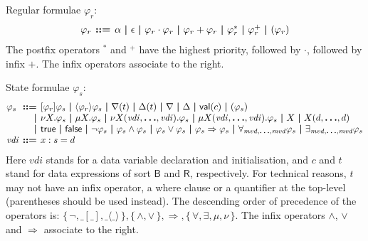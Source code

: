 \documentclass[a4paper,fleqn,10pt]{article}
\makeatletter
\newcommand{\f}[1]{\ensuremath{\mathit{#1}}}
\newcommand{\sbool}{\ensuremath{\mathsf{B}}}
\newcommand{\sreal}{\ensuremath{\mathsf{R}}}
\newenvironment{tightarray}[1]
  {\setlength{\arraycolsep}{2pt}%
   \begin{array}{@{}#1@{}}%
  }
  {\end{array}%
  }
\newcommand{\set}[1]{\ensuremath{\{\,#1\,\}}}
\newcommand{\limp}{\ensuremath{\Rightarrow}}
\newcommand{\mb}[1]{\text{\boldmath$#1$}}
\makeatother
\begin{document}
Regular formulae $\varphi_r$:
\[\begin{tightarray}{lrl}
\varphi_r & \mb{::=} & \alpha\ \mb{|}\ 
                       \epsilon\ \mb{|}\ 
                       \varphi_r \cdot \varphi_r\ \mb{|}\ 
                       \varphi_r + \varphi_r\ \mb{|}\ 
                       \varphi_r^{*} \ \mb{|}\ 
                       \varphi_r^{+} \ \mb{|}\ 
                       ( \varphi_r )
\end{tightarray}\]
The postfix operators ${}^{*}$ and ${}^{+}$ have the highest priority, followed
by $\cdot$, followed by infix $+$. The infix operators associate to the right.

State formulae $\varphi_s$:
\[\begin{tightarray}{lrl}
\varphi_s & \mb{::=} & [\varphi_r]\varphi_s\ \mb{|}\ 
                       \langle\varphi_r\rangle\varphi_s\ \mb{|}\ 
                       \nabla(t)\ \mb{|}\ 
                       \Delta(t)\ \mb{|}\ 
                       \nabla\ \mb{|}\ 
                       \Delta\ \mb{|}\ 
                       \mathsf{val}(c)\ \mb{|}\ 
                       ( \varphi_s )\\
          & \mb{|}   & \nu X. \varphi_s\ \mb{|}\ 
                       \mu X.\varphi_s\ \mb{|}\ 
                       \nu X(\f{vdi},\mb{\ldots},\f{vdi}). \varphi_s\ \mb{|}\ 
                       \mu X(\f{vdi},\mb{\ldots},\f{vdi}).\varphi_s\ \mb{|}\ 
                       X\ \mb{|}\ 
                       X(d,\mb{\ldots},d)\\
          & \mb{|}   & \mathsf{true}\ \mb{|}\ 
                       \mathsf{false}\ \mb{|}\ 
                       \neg \varphi_s\ \mb{|}\ 
                       \varphi_s \land \varphi_s\ \mb{|}\ 
                       \varphi_s \lor  \varphi_s\ \mb{|}\ 
                       \varphi_s \limp \varphi_s\ \mb{|}\ 
                       \forall_{\f{mvd},\mb{\ldots},\f{mvd}} \varphi_s\ \mb{|}\ 
                       \exists_{\f{mvd},\mb{\ldots},\f{mvd}} \varphi_s\\
\f{vdi}  & \mb{::=} & x: s = d\\
\end{tightarray}\]
Here $\f{vdi}$ stands for a data variable declaration and initialisation,
and $c$ and $t$ stand for data expressions of sort $\sbool$ and
$\sreal$, respectively.
For technical reasons, $t$ may not have an infix operator, a where
clause or a quantifier at the top-level (parentheses should be used
instead).
The descending order of precedence of the operators is: $\set{\neg,
\_[\_], \_\langle\_\rangle}, \set{\land,\lor}, \limp, \set{\forall,
\exists, \mu, \nu}$.  The infix operators $\land$, $\lor$ and $\limp$
associate to the right.
\end{document}
